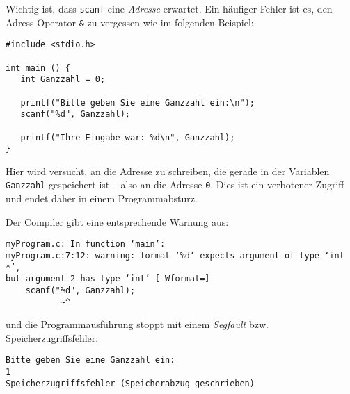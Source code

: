 \begin{warnbox}
Wichtig ist, dass \texttt{scanf} eine \emph{Adresse} erwartet. Ein häufiger Fehler ist es, den Adress-Operator \texttt{\&} zu vergessen wie im folgenden Beispiel:

\begin{warnbox}[Beispiel: Eine Ganzzahl mit \texttt{scanf} einlesen, leftupper=7mm]
\begin{verbatim}
#include <stdio.h>

int main () {
   int Ganzzahl = 0;

   printf("Bitte geben Sie eine Ganzzahl ein:\n");
   scanf("%d", Ganzzahl);

   printf("Ihre Eingabe war: %d\n", Ganzzahl);
}
\end{verbatim}
\end{warnbox}

Hier wird versucht, an die Adresse zu schreiben, die gerade in der Variablen \texttt{Ganzzahl} gespeichert ist -- also an die Adresse \texttt{0}. Dies ist ein verbotener Zugriff und endet daher in einem Programmabsturz.

Der Compiler gibt eine entsprechende Warnung aus:
\begin{cmdbox}
\begin{verbatim}
myProgram.c: In function ‘main’:
myProgram.c:7:12: warning: format ‘%d’ expects argument of type ‘int *’,
but argument 2 has type ‘int’ [-Wformat=]
    scanf("%d", Ganzzahl);
           ~^
\end{verbatim}
\end{cmdbox}

und die Programmausführung stoppt mit einem \emph{Segfault} bzw. Speicherzugriffsfehler:

\begin{cmdbox}
\begin{verbatim}
Bitte geben Sie eine Ganzzahl ein:
1
Speicherzugriffsfehler (Speicherabzug geschrieben)
\end{verbatim}
\end{cmdbox}
\end{warnbox}

